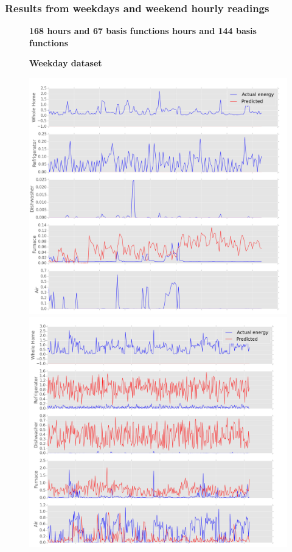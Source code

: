 \subsubsection{Results from weekdays and weekend hourly readings}
\label{sec:days_end}
\begin{figure}[H]
	\centering
	\textbf{168 hours and 67 basis functions  hours and 144 basis functions}\par\medskip
	\textbf{Weekday dataset}
	\begin{minipage}{.45\textwidth}
		\centering
		\includegraphics[scale=0.18]{./figures/results/days_appliances_67_168}
	\end{minipage}%
	\begin{minipage}{.45\textwidth}
		\centering
		\includegraphics[scale=.18]{./figures/results/days_appliances_144_360}
	\end{minipage}
\end{figure}
